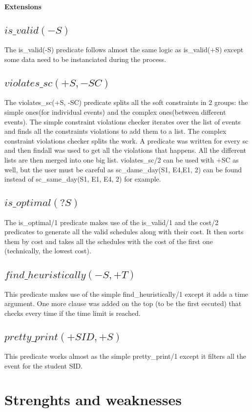\documentclass[a4paper]{article}
\begin{document}
\textbf{Extensions}

\subsection{$is\_valid(-S)$}
The is\_valid(-S) predicate follows almost the same logic as is\_valid(+S) except some data need to be instanciated during the process.
\subsection{$violates\_sc(+S, -SC)$}
The violates\_sc(+S, -SC) predicate splits all the soft constraints in 2 groups: the simple ones(for individual events) and the complex ones(between different events).
The simple constraint violations checker iterates over the list of events and finds all the constraints violations to add them to a list. The complex constraint violations checker splits the work. A predicate was written for every sc and then findall was used to get all the violations that happens. All the different lists are then merged into one big list. 
violates\_sc/2 can be used with $+$SC as well, but the user must be careful as sc\_dame\_day(S1, E4,E1, 2) can be found instead of sc\_same\_day(S1, E1, E4, 2) for example.
\subsection{$is\_optimal(?S)$}
The is\_optimal/1 predicate makes use of the is\_valid/1 and the cost/2 predicates to generate all the valid schedules along with their cost. It then sorts them by cost and takes all the schedules with the cost of the first one (technically, the lowest cost).
\subsection{$find\_heuristically(-S, +T)$}
This predicate makes use of the simple find\_heuristically/1 except it adds a time argument. One more clause was added on the top (to be the first eecuted) that checks every time if the time limit is reached.
\subsection{$pretty\_print(+SID, +S)$}
This predicate works almost as the simple pretty\_print/1 except it filters all the event for the student SID.
\pagebreak

\section{Strenghts and weaknesses}
\end{document}
